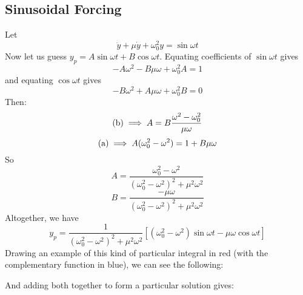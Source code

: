 \subsection{Sinusoidal Forcing}
Let
\[ \ddot y + \mu \dot y + \omega_0^2 y = \sin \omega t \]
Now let us guess \(y_p = A\sin \omega t + B\cos \omega t\). Equating coefficients of \(\sin\omega t\) gives
\[ -A\omega^2 - B\mu\omega + \omega_0^2A = 1 \tag{a} \]
and equating \(\cos\omega t\) gives
\[ -B\omega^2 + A\mu\omega + \omega_0^2B = 0 \tag{b} \]
Then:
\[ (\text b) \implies A = B \frac{\omega^2 - \omega_0^2}{\mu\omega} \]
\[ (\text a) \implies A(\omega_0^2 - \omega^2) = 1 + B\mu\omega \]
So
\[ A = \frac{\omega_0^2 - \omega^2}{(\omega_0^2 - \omega^2)^2 + \mu^2\omega^2} \]
\[ B = \frac{-\mu\omega}{(\omega_0^2 - \omega^2)^2 + \mu^2\omega^2} \]
Altogether, we have
\[ y_p = \frac{1}{(\omega_0^2 - \omega^2)^2 + \mu^2\omega^2}\left[ (\omega_0^2 - \omega^2)\sin\omega t - \mu \omega \cos \omega t \right] \]
Drawing an example of this kind of particular integral in red (with the complementary function in blue), we can see the following:\medskip


\noindent And adding both together to form a particular solution gives:\medskip


